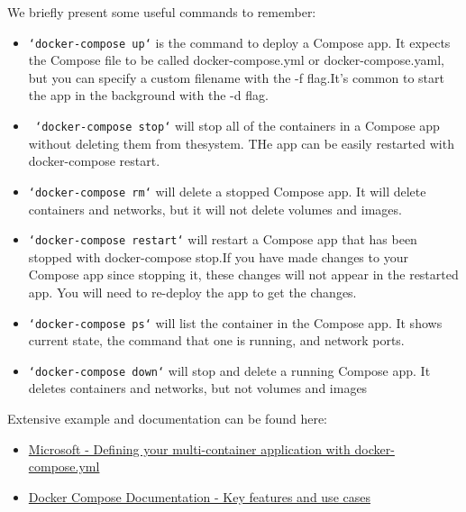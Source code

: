 \documentclass[10pt,a4paper]{report}
\begin{document}
We briefly present some useful commands to remember:
\begin{itemize}
	\item \texttt{`docker-compose up`} is the command to deploy a Compose app. It expects the Compose file to be called docker-compose.yml or docker-compose.yaml, but you can specify a custom filename with the -f flag.It’s common to start the app in the background with the -d flag.
	\item \texttt{ `docker-compose stop`} will stop all of the containers in a Compose app without deleting them from thesystem. THe app can be easily restarted with docker-compose restart.
	\item \texttt{`docker-compose rm`} will delete a stopped Compose app. It will delete containers and networks, but it will not delete volumes and images.
	\item \texttt{`docker-compose restart`} will restart a Compose app that has been stopped with docker-compose stop.If you have made changes to your Compose app since stopping it, these changes will not appear in the restarted app. You will need to re-deploy the app to get the changes.
	\item \texttt{`docker-compose ps`} will list the container in the Compose app. It shows current state, the command that  one is running, and network ports.
	\item \texttt{`docker-compose down`} will stop and delete a running Compose app. It deletes containers and networks, but not volumes and images
\end{itemize}
Extensive example and documentation can be found here:
\begin{itemize}
	\item \href{https://learn.microsoft.com/en-gb/dotnet/architecture/microservices/multi-container-microservice-net-applications/multi-container-applications-docker-compose}{Microsoft -  Defining your multi-container application with docker-compose.yml}
	\item \href{https://docs.docker.com/compose/features-uses/}{Docker Compose Documentation - Key features and use cases}
\end{itemize}
\end{document}
